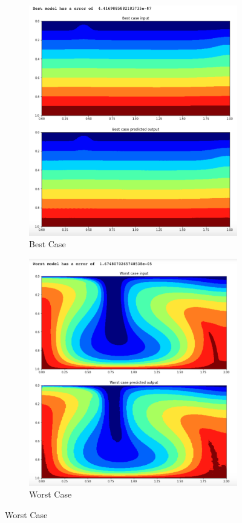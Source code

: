 \begin{figure}[H]
\centering
\begin{subfigure}{0.45\textwidth}
    \includegraphics[width=\textwidth]{Report LaTeX/figures/mantle_convection_images/limited_dataset/ConvAE_Best.png}
    \caption{Best Case}
    \label{fig:first}
\end{subfigure}
\hfill
\begin{subfigure}{0.45\textwidth}
    \includegraphics[width=\textwidth]{Report LaTeX/figures/mantle_convection_images/limited_dataset/ConvAE_Worst.png}
    \caption{Worst Case}
    \label{fig:second}
\end{subfigure}
        

\end{figure}
